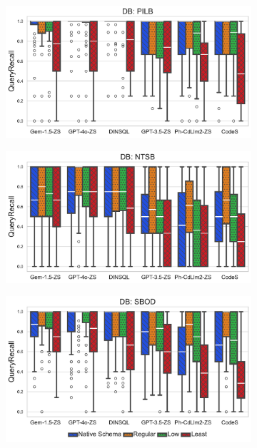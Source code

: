 \begin{figure}
  \centering
  \begin{subfigure}{\figwidthmod\linewidth}
    \centering
    \includegraphics[width=\linewidth]{figures/natlevel-model-recall-boxplot-db-subset-PILB.pdf}
  \end{subfigure}
  \begin{subfigure}{\figwidthmod\linewidth}
    \includegraphics[width=\linewidth]{figures/natlevel-model-recall-boxplot-db-subset-NTSB.pdf}
  \end{subfigure}
  \begin{subfigure}{\figwidthmod\linewidth}
    \includegraphics[width=\linewidth]{figures/natlevel-model-recall-boxplot-db-subset-SBOD.pdf}

\end{subfigure}
\end{figure}
